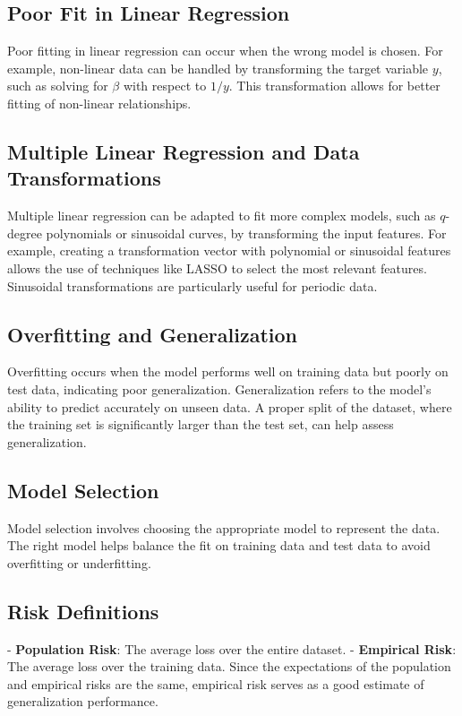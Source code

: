 \documentclass[10pt]{article}
\begin{document}
\begin{multicols}{2}
\subsection*{Poor Fit in Linear Regression}
Poor fitting in linear regression can occur when the wrong model is chosen. For example, non-linear data can be handled by transforming the target variable \( y \), such as solving for \( \beta \) with respect to \( 1/y \). This transformation allows for better fitting of non-linear relationships.

\subsection*{Multiple Linear Regression and Data Transformations}
Multiple linear regression can be adapted to fit more complex models, such as \( q \)-degree polynomials or sinusoidal curves, by transforming the input features. For example, creating a transformation vector with polynomial or sinusoidal features allows the use of techniques like LASSO to select the most relevant features. Sinusoidal transformations are particularly useful for periodic data.

\subsection*{Overfitting and Generalization}
Overfitting occurs when the model performs well on training data but poorly on test data, indicating poor generalization. Generalization refers to the model's ability to predict accurately on unseen data. A proper split of the dataset, where the training set is significantly larger than the test set, can help assess generalization.

\subsection*{Model Selection}
Model selection involves choosing the appropriate model to represent the data. The right model helps balance the fit on training data and test data to avoid overfitting or underfitting.

\subsection*{Risk Definitions}
- \textbf{Population Risk}: The average loss over the entire dataset.
- \textbf{Empirical Risk}: The average loss over the training data. Since the expectations of the population and empirical risks are the same, empirical risk serves as a good estimate of generalization performance.


\end{multicols}
\end{document}
